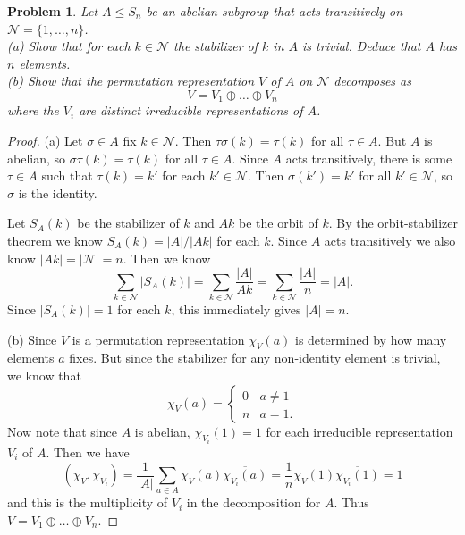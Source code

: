 \documentclass{article}
\newtheorem{problem}{Problem}
\begin{document}
\begin{problem}
Let $A \leq S_n$ be an abelian subgroup that acts transitively on $\mathcal{N} = \{1, \dots , n\}$.\\
(a) Show that for each $k \in \mathcal{N}$ the stabilizer of $k$ in $A$ is trivial. Deduce that $A$ has $n$ elements.\\
(b) Show that the permutation representation $V$ of $A$ on $\mathcal{N}$ decomposes as
\[
V = V_1 \oplus \dots \oplus V_n
\]
where the $V_i$ are distinct irreducible representations of $A$.
\end{problem}
\begin{proof}
(a) Let $\sigma \in A$ fix $k \in \mathcal{N}$. Then $\tau \sigma (k) = \tau (k)$ for all $\tau \in A$. But $A$ is abelian, so $\sigma \tau (k) = \tau (k)$ for all $\tau \in A$. Since $A$ acts transitively, there is some $\tau \in A$ such that $\tau(k) = k'$ for each $k' \in \mathcal{N}$. Then $\sigma(k') = k'$ for all $k' \in \mathcal{N}$, so $\sigma$ is the identity.

Let $S_A(k)$ be the stabilizer of $k$ and $Ak$ be the orbit of $k$. By the orbit-stabilizer theorem we know $S_A(k) = |A|/|Ak|$ for each $k$. Since $A$ acts transitively we also know $|Ak| = |\mathcal{N}| = n$. Then we know
\[
\sum_{k \in \mathcal{N}} |S_A(k)| = \sum_{k \in \mathcal{N}} \frac{|A|}{Ak} = \sum_{k \in \mathcal{N}} \frac{|A|}{n} = |A|.
\]
Since $|S_A(k)| = 1$ for each $k$, this immediately gives $|A| = n$.

(b) Since $V$ is a permutation representation $\chi_V(a)$ is determined by how many elements $a$ fixes. But since the stabilizer for any non-identity element is trivial, we know that
\[
\chi_V(a) =
\begin{cases}
0 & a \neq 1\\
n & a = 1.
\end{cases}
\]
Now note that since $A$ is abelian, $\chi_{V_i}(1) = 1$ for each irreducible representation $V_i$ of $A$. Then we have
\[
(\chi_V, \chi_{V_i}) = \frac{1}{|A|} \sum_{a \in A} \chi_V(a) \overline{\chi_{V_i}(a)} = \frac{1}{n} \chi_V(1) \overline{\chi_{V_i}(1)} = 1
\]
and this is the multiplicity of $V_i$ in the decomposition for $A$. Thus $V = V_1 \oplus \dots \oplus V_n$.
\end{proof}
\end{document}
